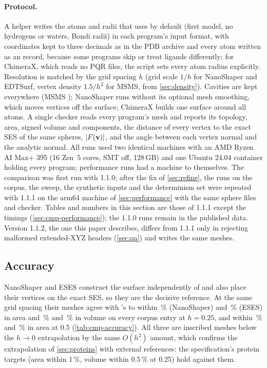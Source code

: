 \paragraph{Protocol.}
A helper writes the atoms and radii that \sesmesh{} uses by default (first
model, no hydrogens or waters, Bondi radii) in each program's input format,
with coordinates kept to three decimals as in the PDB archive and every atom
written as an  record, because some programs skip or treat
 ligands differently; for ChimeraX, which reads no PQR files,
the script sets every atom radius explicitly. Resolution is matched by the
grid spacing $h$ (grid scale $1/h$ for NanoShaper and EDTSurf, vertex density
$1.5/h^2$ for MSMS, from \cref{sec:density}). Cavities are kept everywhere
(MSMS ); NanoShaper runs without its optional mesh
smoothing, which moves vertices off the surface; ChimeraX builds one surface
around all atoms. A single checker reads every program's mesh and reports
its topology, area, signed volume and components, the distance of every
vertex to the exact SES of the same spheres, $|F(\mathbf{v})|$, and the angle
between each vertex normal and the analytic normal. All runs used two
identical machines with an AMD Ryzen AI Max+ 395 (16 Zen~5 cores, SMT off,
128\,GB) and one Ubuntu 24.04 container holding every program; performance
runs had a machine to themselves. The comparison was first run with
\sesmesh{} 1.1.0; after the fix of \cref{sec:refine}, the \sesmesh{} runs on
the corpus, the sweep, the synthetic inputs and the determinism set were
repeated with 1.1.1 on the arm64 machine of \cref{sec:performance} with the
same sphere files and checker. Tables and numbers in this section are those
of 1.1.1 except the timings (\cref{sec:cmp-performance}); the 1.1.0 runs
remain in the published data. Version 1.1.2, the one this paper describes,
differs from 1.1.1 only in rejecting malformed extended-XYZ headers
(\cref{sec:qa}) and writes the same meshes.

\subsection{Accuracy}
\label{sec:cmp-accuracy}

NanoShaper and ESES construct the surface independently of \sesmesh{} and
also place their vertices on the exact SES, so they are the decisive
reference. At the same grid spacing their meshes agree with \sesmesh's to
within \,\% (NanoShaper) and
\,\% (ESES) in area and
\,\% and \,\%
in volume on every corpus entry at $h = 0.25$\Ang, and within
\,\% and \,\%
in area at 0.5\Ang{} (\cref{tab:cmp-accuracy}). All three are inscribed
meshes below the $h \to 0$ extrapolation by the same $O(h^2)$ amount, which
confirms the extrapolation of \cref{sec:proteins} with external references:
the specification's protein targets (area within 1\,\%, volume within
0.5\,\% at 0.25\Ang) hold against them.

